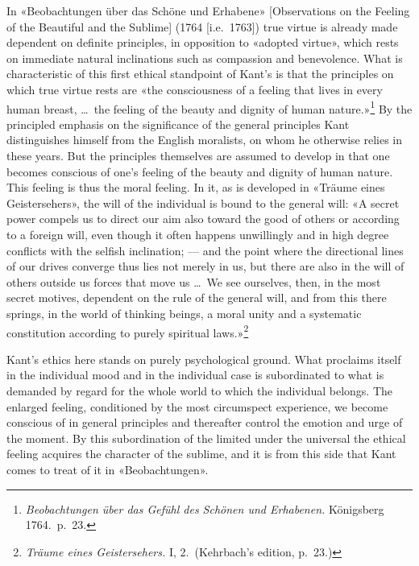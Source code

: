 \documentclass[12pt,a4paper]{article}
\newcommand{\opage}[1]{\marginnote{\footnotesize\textit{[#1]}}}
\begin{document}
In «Beobachtungen über das Schöne und Erhabene» [Observations on the
Feeling of the Beautiful and the Sublime] (1764 [i.e.\ 1763]) true virtue
is already made dependent on definite principles, in opposition to «adopted
virtue», which rests on immediate natural inclinations such as compassion
and benevolence. What is characteristic of this first ethical standpoint of
Kant's is that the principles on which true virtue rests are «the
consciousness of a feeling that lives in every human breast, \ldots\ the
feeling of the beauty and dignity of human
nature.»\footnote{\textit{Beobachtungen über das Gefühl des Schönen und
Erhabenen.} Königsberg 1764.\ p.\ 23.} By the principled emphasis on the
significance of the general principles Kant distinguishes himself from the
English moralists, on whom he otherwise relies in these years. But the
principles themselves are assumed to develop in that one becomes conscious
of one's feeling of the beauty and dignity of human nature. This feeling is
thus the moral feeling. In it, as is developed in «Träume eines
Geistersehers», the will of the individual is bound to the general will: «A
secret power compels us to direct our aim also toward the good of others or
according to a foreign will, even though it often happens unwillingly and
in high degree conflicts with the selfish inclination; --- and the point
where the directional lines of our drives converge thus lies not merely in
us, but there are also in the will of others outside us forces that move us
\ldots\ We see ourselves, then, in the most secret motives, dependent on
the rule of the general will, and from this there springs, in the world of
thinking beings, a moral unity and a systematic constitution according to
purely spiritual laws.»\footnote{\textit{Träume eines Geistersehers.} I,
2.\ (Kehrbach's edition, p.\ 23.)}

Kant's ethics here stands on purely psychological ground. What proclaims
itself in the individual mood and in the individual case is subordinated to
what is demanded by regard for the whole world to which the individual
belongs. The enlarged feeling, conditioned by the most circumspect
experience, we become conscious of in general principles and thereafter
control the emotion and urge of the moment. By this subordination of the
limited under the \opage{40}universal the ethical feeling acquires the character of
the sublime, and it is from this side that Kant comes to treat of it in
«Beobachtungen».
\end{document}
